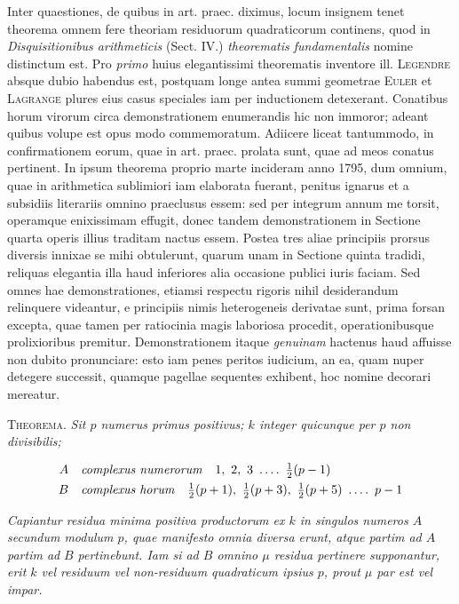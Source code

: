 Inter quaestiones, de quibus in art. praec. diximus, locum insignem tenet theorema omnem fere theoriam residuorum quadraticorum continens, quod in \emph{Disquisitionibus arithmeticis} (Sect. IV.) \emph{theorematis fundamentalis} nomine distinctum est.  Pro \emph{primo} huius elegantissimi theorematis inventore ill. \textsc{Legendre} absque dubio habendus est, postquam longe antea summi geometrae \textsc{Euler} et \textsc{Lagrange} plures eius casus speciales iam per inductionem detexerant.  Conatibus horum virorum circa demonstrationem enumerandis hic non immoror; adeant quibus volupe est opus modo commemoratum.  Adiicere liceat tantummodo, in confirmationem eorum, quae in art. praec. prolata sunt, quae ad meos conatus pertinent.  In ipsum theorema proprio marte incideram anno 1795, dum omnium, quae in arithmetica sublimiori iam elaborata fuerant, penitus ignarus et a subsidiis literariis omnino praeclusus essem: sed per integrum annum me torsit, operamque enixissimam effugit, donec tandem demonstrationem in Sectione quarta operis illius traditam nactus essem.  Postea tres aliae principiis prorsus diversis innixae se mihi obtulerunt, quarum unam in Sectione quinta tradidi, reliquas elegantia illa haud inferiores alia occasione publici iuris faciam.  Sed omnes hae demonstrationes, etiamsi respectu rigoris nihil desiderandum relinquere videantur, e principiis nimis heterogeneis derivatae sunt, prima forsan excepta, quae tamen per ratiocinia magis laboriosa procedit, operationibusque prolixioribus premitur.  Demonstrationem itaque \emph{genuinam} hactenus haud affuisse non dubito pronunciare: esto iam penes peritos iudicium, an ea, quam nuper detegere successit, quamque pagellae sequentes exhibent, hoc nomine decorari mereatur.


\textsc{Theorema.}  \emph{Sit $p$ numerus primus positivus; $k$ integer quicunque per $p$ non} \emph{divisibilis;}

\[
\begin{aligned}
A &\quad \text{\emph{complexus numerorum}}\quad 1,\ 2,\ 3\ \dotsfour\ \tfrac12(p-1)\\
B &\quad \text{\emph{complexus horum}}\quad \tfrac12(p+1),\ \tfrac12(p+3),\ \tfrac12(p+5)\ \dotsfour\ p-1
\end{aligned}
\]

\emph{Capiantur residua minima positiva productorum ex $k$ in singulos numeros $A$ secundum modulum $p$, quae manifesto omnia diversa erunt, atque partim ad $A$ partim ad} \emph{$B$ pertinebunt.  Iam si ad $B$ omnino $\mu$ residua pertinere supponantur, erit $k$ vel residuum vel non-residuum quadraticum ipsius $p$, prout $\mu$ par est vel impar.}

